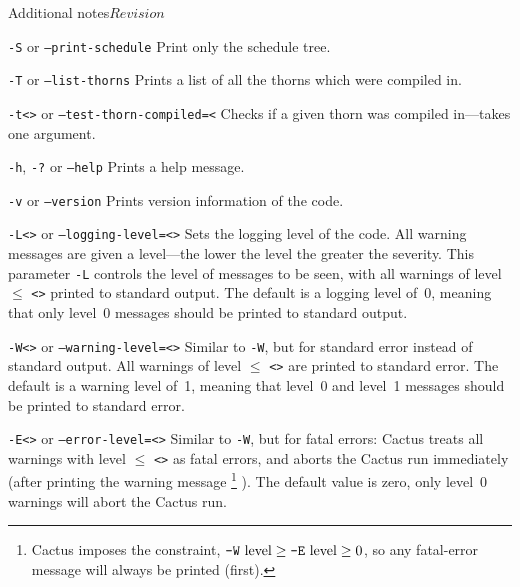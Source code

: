 \begin{cactuspart}{Additional notes}{}{$Revision$}
\begin{Lentry}
\item [\texttt{-S} or \texttt{--print-schedule}]
Print only the schedule tree.

\item [\texttt{-T} or \texttt{--list-thorns}]
Prints a list of all the thorns which were compiled in.

\item [\texttt{-t<\var{arrangement or thorn}>} or \texttt{--test-thorn-compiled=<\var{arrangement or thorn>}} ]
Checks if a given thorn was compiled in---takes one argument.

\item [\texttt{-h}, \texttt{-?} or \texttt{--help}]
Prints a help message.

\item [\texttt{-v} or \texttt{--version}]
Prints version information of the code.


\item [\texttt{-L<\var{level}>} or \texttt{--logging-level=<\var{level}>}]
Sets the logging level of the code.  All warning messages are given a
level---the lower the level the greater the severity.  This
parameter \texttt{-L} controls the level of messages to be seen, with all
warnings of level $\le$ \texttt{<>} printed to standard output.  The
default is a logging level of~0, meaning that only level~0 messages
should be printed to standard output.

\item [\texttt{-W<\var{level}>} or \texttt{--warning-level=<\var{level}>}]
Similar to \texttt{-W}, but for standard error instead of
standard output.  All warnings of level $\le$ \texttt{<>} are
printed to standard error.  The default is a warning level of~1,
meaning that level~0 and level~1 messages should be printed to
standard error.

\item [\texttt{-E<\var{level}>} or \texttt{--error-level=<\var{level}>}]
Similar to \texttt{-W}, but for fatal errors: Cactus treats all
warnings with level $\le$ \texttt{<>} as fatal errors, and aborts
the Cactus run immediately (after printing the warning message%
\footnote{%
         Cactus imposes the constraint,
         $\hbox{\texttt{-W} level} \ge \hbox{\texttt{-E} level} \ge 0$,
         so any fatal-error message will always be printed (first).
         }%
).  The default value is zero, \ie{} only level~0 warnings
will abort the Cactus run.


\end{Lentry}
\end{cactuspart}
